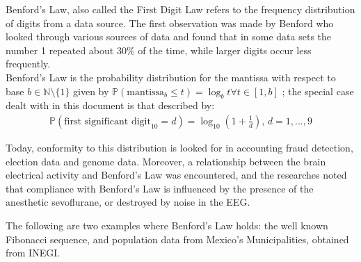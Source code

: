 Benford's Law, also called the First Digit Law refers to the frequency distribution of digits from a data source.  The first observation was made by Benford \cite{Benford38} who looked through various sources of data and found that in some data sets the number 1 repeated about 30\% of the time, while larger digits occur less frequently. \\

Benford's Law is the probability distribution for the mantissa with respect to base $b \in \mathbb{N} \setminus \{1\}$ given by $\mathbb{P}(\text{mantissa}_b \leq t)=\log_b t  \forall t \in [1,b]$ ; the special case dealt with in this document is that described by:\\
\begin{align*}
    \mathbb{P}(\text{first significant digit}_{10} = d) = \log_{10}(1+\frac{1}{d})\text{,   }d=1,...,9
\end{align*}


Today, conformity to this distribution is looked for in accounting fraud detection\cite{Nigrini97}, election data and genome data. Moreover, a relationship between the brain electrical activity and Benford's Law was encountered, and the researches noted that compliance with Benford's Law is influenced by the presence of the anesthetic sevoflurane, or destroyed by noise in the EEG\cite{Kreuzer14}.

The following are two examples where Benford's Law holds: the well known Fibonacci sequence, and population data from Mexico's Municipalities, obtained from INEGI.
